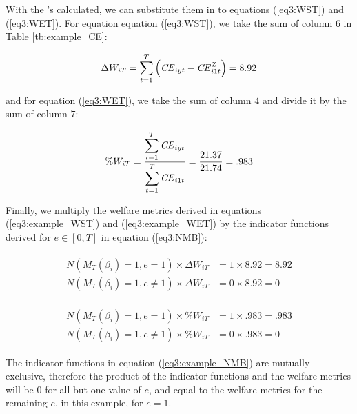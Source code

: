 \documentclass[../main.tex]{subfiles}
\begin{document}
With the {\CE}'s calculated, we can substitute them in to equations (\ref{eq3:WST}) and (\ref{eq3:WET}).
For equation equation (\ref{eq3:WST}), we take the sum of column $6$ in Table \ref{tb:example_CE}:

\begin{equation}
	\label{eq3:example_WST}
	\Delta W_{iT} = \sum_{t=1}^T \left( {\mathit{CE}}_{iyt} - {\mathit{CE}}_{i1t}^Z \right) = 8.92
\end{equation}

\noindent and for equation (\ref{eq3:WET}), we take the sum of column $4$ and divide it by the sum of column $7$:

\begin{equation}
	\label{eq3:example_WET}
	\%W_{iT} = \frac{\displaystyle\sum_{t=1}^{T} {\mathit{CE}}_{iyt} }{\displaystyle\sum_{t=1}^{T} {\mathit{CE}}_{i1t}} = \frac{21.37}{21.74} = .983
\end{equation}

\noindent Finally, we multiply the welfare metrics derived in equations (\ref{eq3:example_WST}) and (\ref{eq3:example_WET}) by the indicator functions derived for $e \in [0,T]$ in equation (\ref{eq3:NMB}):

\begin{align}
	\label{eq3:example_NMBWST}
	\begin{split}
		N( M_T(\beta_i) = 1, e = 1 )  \times \Delta W_{iT} &= 1 \times 8.92 = 8.92\\
		N( M_T(\beta_i) = 1, e \neq 1 )  \times \Delta W_{iT} &= 0 \times 8.92 = 0
	\end{split}
\end{align}

\begin{align}
	\label{eq3:example_NMBWET}
	\begin{split}
		N( M_T(\beta_i) = 1, e = 1 )  \times \%W_{iT} &= 1 \times .983 = .983\\
		N( M_T(\beta_i) = 1, e \neq 1 )  \times \%W_{iT} &= 0 \times .983 = 0
	\end{split}
\end{align}

\noindent The indicator functions in equation (\ref{eq3:example_NMB}) are mutually exclusive, therefore the product of the indicator functions and the welfare metrics will be $0$ for all but one value of $e$, and equal to the welfare metrics for the remaining $e$, in this example, for $e = 1$.
\end{document}
